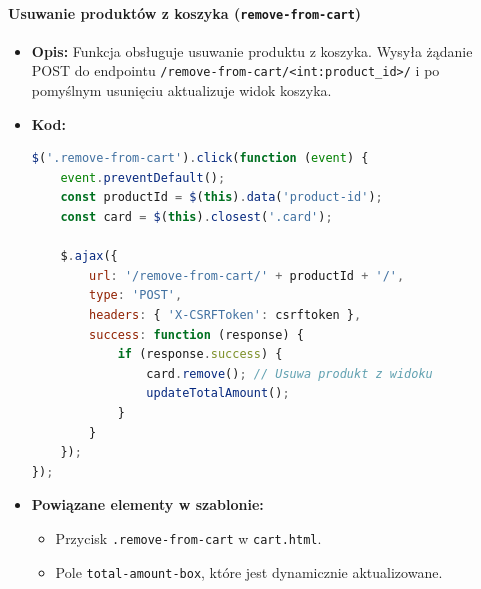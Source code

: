\documentclass[12pt,a4paper,oneside]{article}
\theoremstyle{definition}
\numberwithin{equation}{section}
\begin{document}
\paragraph{Usuwanie produktów z koszyka (\texttt{remove-from-cart})}
\begin{itemize}
    \item \textbf{Opis:}  
    Funkcja obsługuje usuwanie produktu z koszyka. Wysyła żądanie POST do endpointu \texttt{/remove-from-cart/<int:product\_id>/} i po pomyślnym usunięciu aktualizuje widok koszyka.
    \item \textbf{Kod:}
\begin{lstlisting}[language=JavaScript, caption=Kod funkcji remove-from-cart]
$('.remove-from-cart').click(function (event) {
    event.preventDefault();
    const productId = $(this).data('product-id');
    const card = $(this).closest('.card');

    $.ajax({
        url: '/remove-from-cart/' + productId + '/',
        type: 'POST',
        headers: { 'X-CSRFToken': csrftoken },
        success: function (response) {
            if (response.success) {
                card.remove(); // Usuwa produkt z widoku
                updateTotalAmount(); 
            }
        }
    });
});
\end{lstlisting}
    \item \textbf{Powiązane elementy w szablonie:}
    \begin{itemize}
        \item Przycisk \texttt{.remove-from-cart} w \texttt{cart.html}.
        \item Pole \texttt{total-amount-box}, które jest dynamicznie aktualizowane.
    \end{itemize}
\end{itemize}
\end{document}
